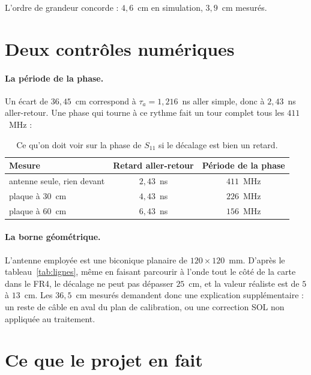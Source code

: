 \documentclass[11pt,a4paper]{article}
\begin{document}
L'ordre de grandeur concorde : $4{,}6$~cm en simulation, $3{,}9$~cm mesurés.

\section{Deux contrôles numériques}

\paragraph{La période de la phase.}
Un écart de $36{,}45$~cm correspond à $\tau_a = 1{,}216$~ns aller simple, donc
à $2{,}43$~ns aller-retour. Une phase qui tourne à ce rythme fait un tour
complet tous les $411$~MHz :

\begin{table}[H]
\centering
\begin{tabular}{lcc}
\toprule
Mesure & Retard aller-retour & Période de la phase \\
\midrule
antenne seule, rien devant & $2{,}43$~ns & $411$~MHz \\
plaque à $30$~cm & $4{,}43$~ns & $226$~MHz \\
plaque à $60$~cm & $6{,}43$~ns & $156$~MHz \\
\bottomrule
\end{tabular}
\caption{Ce qu'on doit voir sur la phase de $S_{11}$ si le décalage est bien un
retard.}
\label{tab:periodes}
\end{table}

\paragraph{La borne géométrique.}
L'antenne employée est une biconique planaire de $120 \times 120$~mm. D'après le
tableau~\ref{tab:lignes}, même en faisant parcourir à l'onde tout le côté de la
carte dans le FR4, le décalage ne peut pas dépasser $25$~cm, et la valeur
réaliste est de $5$ à $13$~cm. Les $36{,}5$~cm mesurés demandent donc une
explication supplémentaire : un reste de câble en aval du plan de calibration,
ou une correction SOL non appliquée au traitement.

\section{Ce que le projet en fait}
\end{document}

